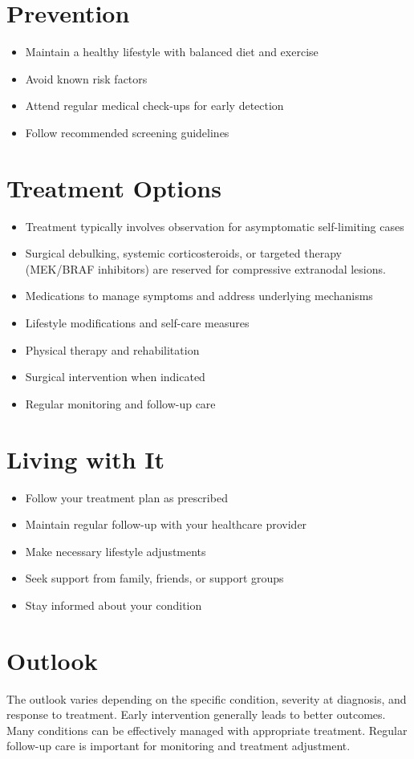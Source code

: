 \section{Prevention}
\begin{itemize}[noitemsep]
  \item Maintain a healthy lifestyle with balanced diet and exercise
  \item Avoid known risk factors
  \item Attend regular medical check-ups for early detection
  \item Follow recommended screening guidelines
\end{itemize}
\section{Treatment Options}
\begin{itemize}[noitemsep]
  \item Treatment typically involves observation for asymptomatic self-limiting cases
  \item Surgical debulking, systemic corticosteroids, or targeted therapy (MEK/BRAF inhibitors) are reserved for compressive extranodal lesions.
  \item Medications to manage symptoms and address underlying mechanisms
  \item Lifestyle modifications and self-care measures
  \item Physical therapy and rehabilitation
  \item Surgical intervention when indicated
  \item Regular monitoring and follow-up care
\end{itemize}
\section{Living with It}
\begin{itemize}[noitemsep]
  \item Follow your treatment plan as prescribed
  \item Maintain regular follow-up with your healthcare provider
  \item Make necessary lifestyle adjustments
  \item Seek support from family, friends, or support groups
  \item Stay informed about your condition
\end{itemize}
\section{Outlook}
The outlook varies depending on the specific condition, severity at diagnosis, and response to treatment. Early intervention generally leads to better outcomes. Many conditions can be effectively managed with appropriate treatment. Regular follow-up care is important for monitoring and treatment adjustment.
